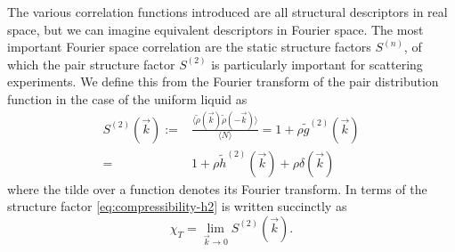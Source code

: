 The various correlation functions introduced are all structural descriptors in real space, but we can imagine equivalent descriptors in Fourier space.
The most important Fourier space correlation are the static structure factors $S^{(n)}$, of which the pair structure factor $S^{(2)}$ is particularly important for scattering experiments.
We define this from the Fourier transform of the pair distribution function in the case of the uniform liquid as
\begin{equation}\label{eq:static-structure-factor}
  \begin{split}
    S^{(2)}(\vec{k})
    :=&
    \frac{
      \big\langle \widetilde{\rho}(\vec{k}) \widetilde{\rho}(-\vec{k}) \big\rangle
    }{
      \langle N \rangle
    }
    =
    1 + \rho \widetilde{g}^{(2)}(\vec{k})
    \\ =&
    1 + \rho \widetilde{h}^{(2)}(\vec{k}) + \rho \delta(\vec{k})
  \end{split}
\end{equation}
where the tilde over a function denotes its Fourier transform.
In terms of the structure factor \eqref{eq:compressibility-h2} is written succinctly as%
\begin{equation}
  \chi_T = \lim_{\vec{k} \to 0} S^{(2)}(\vec{k}).
\end{equation}




